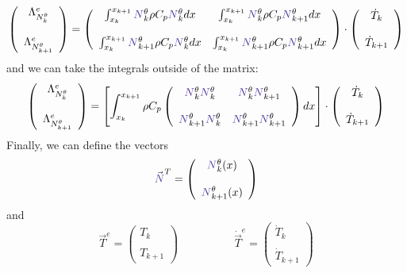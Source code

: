 \[
\left(
\begin{array}{c}
{\Lambda}_{N_k^\theta}^e  \\ \\ {\Lambda}_{N_{k+1}^\theta}^e
\end{array}
\right)
=
\left(
\begin{array}{cc}
\int_{x_k}^{x_{k+1}} {\color{Violet}N}_k^\theta     \rho C_p {\color{Violet}N}_{k}^\theta dx  
&  \int_{x_k}^{x_{k+1}} {\color{Violet}N}_k^\theta  \rho C_p {\color{Violet}N}_{k+1}^\theta dx \\ \\
\int_{x_k}^{x_{k+1}} {\color{Violet}N}_{k+1}^\theta \rho C_p {\color{Violet}N}_{k}^\theta dx  
&  \int_{x_k}^{x_{k+1}} {\color{Violet}N}_{k+1}^\theta \rho C_p {\color{Violet}N}_{k+1}^\theta dx 
\end{array}
\right)
\cdot
\left(
\begin{array}{c}
\dot{T}_k \\ \\
\dot{T}_{k+1}
\end{array}
\right)
\]
and we can take the integrals outside of the matrix:
\[
\left(
\begin{array}{c}
{\Lambda}_{N_k^\theta}^e \\ \\ {\Lambda}_{N_{k+1}^\theta}^e
\end{array}
\right)
=
\left[
\int_{x_k}^{x_{k+1}}
\rho C_p
\left(
\begin{array}{cc}
{\color{Violet}N}_k^\theta     {\color{Violet}N}_{k}^\theta &  {\color{Violet}N}_k^\theta     {\color{Violet}N}_{k+1}^\theta  \\ \\
{\color{Violet}N}_{k+1}^\theta {\color{Violet}N}_{k}^\theta &  {\color{Violet}N}_{k+1}^\theta {\color{Violet}N}_{k+1}^\theta 
\end{array}
\right)
dx
\right]
\cdot
\left(
\begin{array}{c}
\dot{T}_k \\ \\ 
\dot{T}_{k+1}
\end{array}
\right)
\]
Finally, we can define the vectors 
\[
{\vec {\color{Violet}N}}^T = 
\left(
\begin{array}{c}
{\color{Violet}N}_k^\theta(x)  \\ \\  {\color{Violet}N}_{k+1}^\theta (x)
\end{array}
\right)
\]
and 
\[
{\vec T}^e = 
\left(
\begin{array}{c}
T_k \\ \\ T_{k+1}
\end{array}
\right)
\quad
\quad
\quad
\quad
\quad
\dot{\vec T}^e = 
\left(
\begin{array}{c}
\dot{T}_k \\ \\ \dot{T}_{k+1}
\end{array}
\right)
\]
